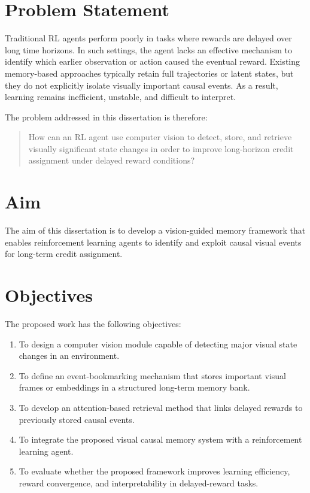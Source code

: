 \documentclass[12pt,a4paper]{article}
\begin{document}
\section{Problem Statement}

Traditional RL agents perform poorly in tasks where rewards are delayed over long time horizons. In such settings, the agent lacks an effective mechanism to identify which earlier observation or action caused the eventual reward. Existing memory-based approaches typically retain full trajectories or latent states, but they do not explicitly isolate visually important causal events. As a result, learning remains inefficient, unstable, and difficult to interpret.

The problem addressed in this dissertation is therefore:

\begin{quote}
How can an RL agent use computer vision to detect, store, and retrieve visually significant state changes in order to improve long-horizon credit assignment under delayed reward conditions?
\end{quote}

\section{Aim}

The aim of this dissertation is to develop a vision-guided memory framework that enables reinforcement learning agents to identify and exploit causal visual events for long-term credit assignment.

\section{Objectives}

The proposed work has the following objectives:

\begin{enumerate}[label=\arabic*.]
    \item To design a computer vision module capable of detecting major visual state changes in an environment.
    \item To define an event-bookmarking mechanism that stores important visual frames or embeddings in a structured long-term memory bank.
    \item To develop an attention-based retrieval method that links delayed rewards to previously stored causal events.
    \item To integrate the proposed visual causal memory system with a reinforcement learning agent.
    \item To evaluate whether the proposed framework improves learning efficiency, reward convergence, and interpretability in delayed-reward tasks.
\end{enumerate}
\end{document}
